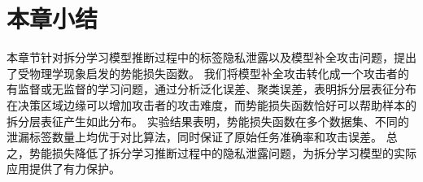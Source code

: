 \section{本章小结}
本章节针对拆分学习模型推断过程中的标签隐私泄露以及模型补全攻击问题，提出了受物理学现象启发的势能损失函数。
%
我们将模型补全攻击转化成一个攻击者的有监督或无监督的学习问题，通过分析泛化误差、聚类误差，表明拆分层表征分布在决策区域边缘可以增加攻击者的攻击难度，而势能损失函数恰好可以帮助样本的拆分层表征产生如此分布。
%
实验结果表明，势能损失函数在多个数据集、不同的泄漏标签数量上均优于对比算法，同时保证了原始任务准确率和攻击误差。
%
总之，势能损失降低了拆分学习推断过程中的隐私泄露问题，为拆分学习模型的实际应用提供了有力保护。